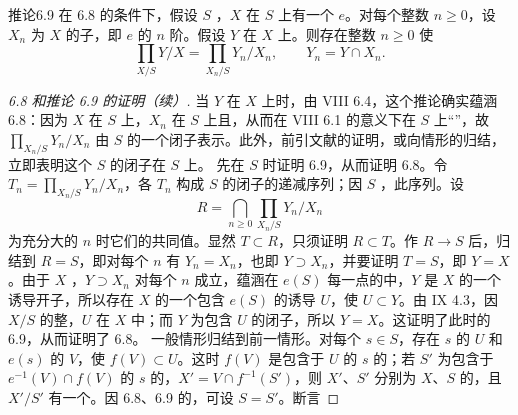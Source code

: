 \begin{SGAresult}{推论}{6.9}
在 6.8 的条件下，假设 $S$ ，$X$ 在 $S$ 上有一个 $e$。对每个整数 $n\ge0$，设 $X_n$ 为 $X$ 的子，即 $e$ 的 $n$ 阶。假设 $Y$ 在 $X$ 上。则存在整数 $n\ge0$ 使
\[\prod_{X/S}Y/X=\prod_{X_n/S}Y_n/X_n,\qquad Y_n=Y\cap X_n.\]
\end{SGAresult}
\begin{proof}[ 6.8 和推论 6.9 的证明（续）]
当 $Y$ 在 $X$ 上时，由 VIII 6.4，这个推论确实蕴涵 6.8：因为 $X$ 在 $S$ 上，$X_n$ 在 $S$ 上且，从而在 VIII 6.1 的意义下在 $S$ 上“”，故 $\prod_{X_n/S}Y_n/X_n$ 由 $S$ 的一个闭子表示。此外，前引文献的证明，或向情形的归结，立即表明这个 $S$ 的闭子在 $S$ 上。
先在 $S$ 时证明 6.9，从而证明 6.8。令 $T_n=\prod_{X_n/S}Y_n/X_n$，各 $T_n$ 构成 $S$ 的闭子的递减序列；因 $S$ ，此序列。设
\[R=\bigcap_{n\ge0}\prod_{X_n/S}Y_n/X_n\]
为充分大的 $n$ 时它们的共同值。显然 $T\subset R$，只须证明 $R\subset T$。作 $R\to S$ 后，归结到 $R=S$，即对每个 $n$ 有 $Y_n=X_n$，也即 $Y\supset X_n$，并要证明 $T=S$，即 $Y=X$。由于 $X$ ，$Y\supset X_n$ 对每个 $n$ 成立，蕴涵在 $e(S)$ 每一点的中，$Y$ 是 $X$ 的一个诱导开子，所以存在 $X$ 的一个包含 $e(S)$ 的诱导 $U$，使 $U\subset Y$。由 IX 4.3，因 $X/S$ 的整，$U$ 在 $X$ 中；而 $Y$ 为包含 $U$ 的闭子，所以 $Y=X$。这证明了此时的 6.9，从而证明了 6.8。
一般情形归结到前一情形。对每个 $s\in S$，存在 $s$ 的 $U$ 和 $e(s)$ 的 $V$，使 $f(V)\subset U$。这时 $f(V)$ 是包含于 $U$ 的 $s$ 的；若 $S'$ 为包含于 $e^{-1}(V)\cap f(V)$ 的 $s$ 的，$X'=V\cap f^{-1}(S')$，则 $X'$、$S'$ 分别为 $X$、$S$ 的，且 $X'/S'$ 有一个。因 6.8、6.9 的，可设 $S=S'$。断言

\end{proof}
